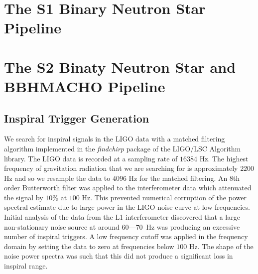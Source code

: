 \section{The S1 Binary Neutron Star Pipeline}

\section{The S2 Binaty Neutron Star and BBHMACHO Pipeline}

\subsection{Inspiral Trigger Generation}
\label{ss:trigger}

We search for inspiral signals in the LIGO data with a matched
filtering\cite{wz} algorithm implemented in the \emph{findchirp}
package\cite{findchirp} of the LIGO/LSC Algorithm library\cite{lal}. The LIGO
data is recorded at a sampling rate of $16384$ Hz.  The highest frequency of
gravitation radiation that we are searching for is approximately $2200$ Hz and
so we resample the data to $4096$ Hz for the matched filtering.  An 8th order
Butterworth filter was applied to the interferometer data which attenuated the
signal by $10\%$ at $100$ Hz. This prevented numerical corruption of the power
spectral estimate due to large power in the LIGO noise curve at low
frequencies. Initial analysis of the data from the L1 interferometer
discovered that a large non-stationary noise source at around $60$---$70$~Hz
was producing an excessive number of inspiral triggers. A low frequency cutoff
was applied in the frequency domain by setting the data to zero at frequencies
below $100$ Hz.  The shape of the noise power spectra was such that this did
not produce a significant loss in inspiral range. 

